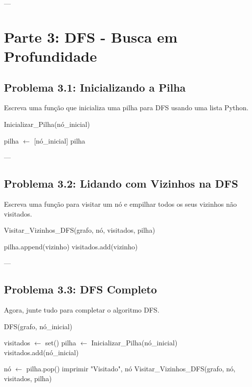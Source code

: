 \documentclass{article}
\begin{document}
---

\section*{Parte 3: DFS - Busca em Profundidade}

\subsection*{Problema 3.1: Inicializando a Pilha}

Escreva uma função que inicializa uma pilha para DFS usando uma lista Python.

\begin{algorithm}[H]
\caption{Inicializar\_Pilha(nó\_inicial)}
\begin{algorithmic}
    \STATE pilha $\gets$ [nó\_inicial] 
    \RETURN pilha
\end{algorithmic}
\end{algorithm}

---

\subsection*{Problema 3.2: Lidando com Vizinhos na DFS}

Escreva uma função para visitar um nó e empilhar todos os seus vizinhos não visitados.

\begin{algorithm}[H]
\caption{Visitar\_Vizinhos\_DFS(grafo, nó, visitados, pilha)}
\begin{algorithmic}
            \STATE pilha.append(vizinho) 
            \STATE visitados.add(vizinho)
        \ENDIF
    \ENDFOR
\end{algorithmic}
\end{algorithm}

---

\subsection*{Problema 3.3: DFS Completo}

Agora, junte tudo para completar o algoritmo DFS.

\begin{algorithm}[H]
\caption{DFS(grafo, nó\_inicial)}
\begin{algorithmic}
    \STATE visitados $\gets$ set() 
    \STATE pilha $\gets$ Inicializar\_Pilha(nó\_inicial)
    \STATE visitados.add(nó\_inicial)

        \STATE nó $\gets$ pilha.pop() 
        \STATE imprimir "Visitado", nó
        \STATE Visitar\_Vizinhos\_DFS(grafo, nó, visitados, pilha)
    \ENDWHILE
\end{algorithmic}
\end{algorithm}
\end{document}
